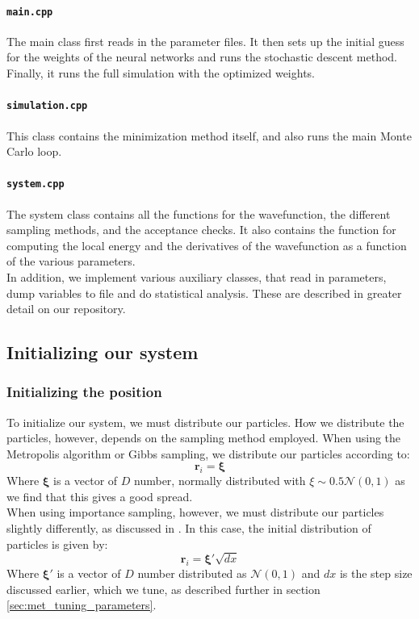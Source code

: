 \documentclass[a4paper, 10pt]{article}
\begin{document}
	\paragraph{\texttt{main.cpp}}
	The main class first reads in the parameter files. It then sets up the initial guess for the weights of the neural networks and runs the stochastic descent method. Finally, it runs the full simulation with the optimized weights.\\
	\paragraph{\texttt{simulation.cpp}}
	This class contains the minimization method itself, and also runs the main Monte Carlo loop.
	\paragraph{\texttt{system.cpp}}
	The system class contains all the functions for the wavefunction, the different sampling methods, and the acceptance checks. It also contains the function for computing the local energy and the derivatives of the wavefunction as a function of the various parameters.\\
	\linebreak
	In addition, we implement various auxiliary classes, that read in parameters, dump variables to file and do statistical analysis. These are described in greater detail on our repository.
	\subsection{Initializing our system}\label{sec:Initialization}
	\subsubsection{Initializing the position}
	To initialize our system, we must distribute our particles. How we distribute the particles, however, depends on the sampling method employed. When using the Metropolis algorithm or Gibbs sampling, we distribute our particles according to:
	\begin{equation}
	\boldsymbol{r}_i=\boldsymbol{\xi}
	\end{equation}
	Where $\boldsymbol{\xi}$ is a vector of $D$ number, normally distributed with $\xi \sim 0.5\mathcal{N}(0,1)$ as we find that this gives a good spread.\\
	\linebreak
	When using importance sampling, however, we must distribute our particles slightly differently, as discussed in \cite{Hjorth-Jensen2015}. In this case, the initial distribution of particles is given by:
	\begin{equation}
	\boldsymbol{r}_i=\boldsymbol{\xi'}\sqrt{dx}
	\end{equation}
	Where $\boldsymbol{\xi'}$ is a vector of $D$ number distributed as $\mathcal{N}(0,1)$ and $dx$ is the step size discussed earlier, which we tune, as described further in section \ref{sec:met_tuning_parameters}.
\end{document}
